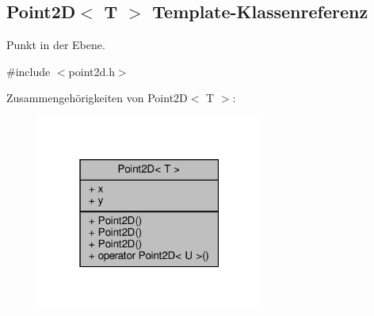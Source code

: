 \hypertarget{classPoint2D}{}\subsection{Point2D$<$ T $>$ Template-\/\+Klassenreferenz}
\label{classPoint2D}


Punkt in der Ebene.  




{\ttfamily \#include $<$point2d.\+h$>$}



Zusammengehörigkeiten von Point2D$<$ T $>$\+:
\nopagebreak
\begin{figure}[H]
\begin{center}
\leavevmode
\includegraphics[width=211pt]{classPoint2D__coll__graph}
\end{center}
\end{figure}

